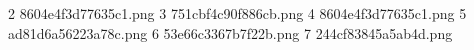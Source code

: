 2 8604e4f3d77635c1.png
3 751cbf4c90f886cb.png
4 8604e4f3d77635c1.png
5 ad81d6a56223a78c.png
6 53e66c3367b7f22b.png
7 244cf83845a5ab4d.png
